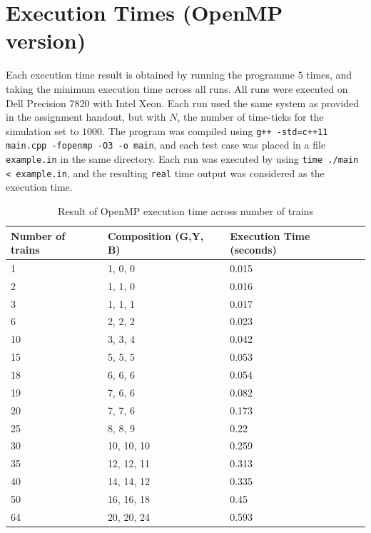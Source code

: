 \documentclass[12pt]{article}
\begin{document}
\section{Execution Times (OpenMP version)}

Each execution time result is obtained by running the programme $5$ times, and taking the minimum execution time across all runs. All runs were executed on Dell Precision 7820 with Intel Xeon. Each run used the same system as provided in the assignment handout, but with $N$, the number of time-ticks for the simulation set to $1000$. The program was compiled using \verb!g++ -std=c++11 main.cpp -fopenmp -O3 -o main!, and each test case was placed in a file \verb!example.in! in the same directory. Each run was executed by using \verb!time ./main < example.in!, and the resulting \verb!real! time output was considered as the execution time.

\begin{table}[]
\begin{tabular}{|l|l|l|}
\hline
Number of trains & Composition (G,Y, B) & Execution Time (seconds) \\ \hline
1                & 1, 0, 0              & 0.015                    \\ \hline
2                & 1, 1, 0              & 0.016                    \\ \hline
3                & 1, 1, 1              & 0.017                    \\ \hline
6                & 2, 2, 2              & 0.023                    \\ \hline
10               & 3, 3, 4              & 0.042                    \\ \hline
15               & 5, 5, 5              & 0.053                    \\ \hline
18               & 6, 6, 6              & 0.054                    \\ \hline
19               & 7, 6, 6              & 0.082                    \\ \hline
20               & 7, 7, 6              & 0.173                    \\ \hline
25               & 8, 8, 9              & 0.22                     \\ \hline
30               & 10, 10, 10           & 0.259                    \\ \hline
35               & 12, 12, 11           & 0.313                    \\ \hline
40               & 14, 14, 12           & 0.335                    \\ \hline
50               & 16, 16, 18           & 0.45                     \\ \hline
64               & 20, 20, 24           & 0.593                    \\ \hline
\end{tabular}
\caption{Result of OpenMP execution time across number of trains}
\end{table}
\end{document}
